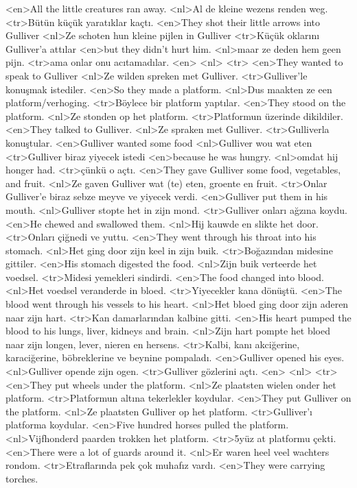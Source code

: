 <en>All the little creatures ran away.
<nl>Al de kleine wezens renden weg.
<tr>Bütün küçük yaratıklar kaçtı.
<en>They shot their little arrows into Gulliver
<nl>Ze schoten hun kleine pijlen in Gulliver
<tr>Küçük oklarını Gulliver’a attılar
<en>but they didn’t hurt him.
<nl>maar ze deden hem geen pijn.
<tr>ama onlar onu acıtamadılar.
<en>
<nl>
<tr>
<en>They wanted to speak to Gulliver
<nl>Ze wilden spreken met Gulliver.
<tr>Gulliver’le konuşmak istediler.
<en>So they made a platform.
<nl>Dus maakten ze een platform/verhoging.
<tr>Böylece bir platform yaptılar.
<en>They stood on the platform.
<nl>Ze stonden op het platform.
<tr>Platformun üzerinde dikildiler.
<en>They talked to Gulliver.
<nl>Ze spraken met Gulliver.
<tr>Gulliverla konuştular.
<en>Gulliver wanted some food
<nl>Gulliver wou wat eten
<tr>Gulliver biraz yiyecek istedi
<en>because he was hungry.
<nl>omdat hij honger had.
<tr>çünkü o açtı.
<en>They gave Gulliver some food, vegetables, and fruit.
<nl>Ze gaven Gulliver wat (te) eten, groente en fruit.
<tr>Onlar Gulliver’e biraz sebze meyve ve yiyecek verdi.
<en>Gulliver put them in his mouth.
<nl>Gulliver stopte het in zijn mond.
<tr>Gulliver onları ağzına koydu.
<en>He chewed and swallowed them.
<nl>Hij kauwde en slikte het door.
<tr>Onları çiğnedi ve yuttu.
<en>They went through his throat into his stomach.
<nl>Het ging door zijn keel in zijn buik.
<tr>Boğazından midesine gittiler.
<en>His stomach digested the food.
<nl>Zijn buik verteerde het voedsel.
<tr>Midesi yemekleri sindirdi.
<en>The food changed into blood.
<nl>Het voedsel veranderde in bloed.
<tr>Yiyecekler kana dönüştü.
<en>The blood went through his vessels to his heart.
<nl>Het bloed ging door zijn aderen naar zijn hart.
<tr>Kan damarlarından kalbine gitti.
<en>His heart pumped the blood to his lungs, liver, kidneys and brain.
<nl>Zijn hart pompte het bloed naar zijn longen, lever, nieren en hersens.
<tr>Kalbi, kanı akciğerine, karaciğerine, böbreklerine ve beynine pompaladı.
<en>Gulliver opened his eyes.
<nl>Gulliver opende zijn ogen.
<tr>Gulliver gözlerini açtı.
<en>
<nl>
<tr>
<en>They put wheels under the platform.
<nl>Ze plaatsten wielen onder het platform.
<tr>Platformun altına tekerlekler koydular.
<en>They put Gulliver on the platform.
<nl>Ze plaatsten Gulliver op het platform.
<tr>Gulliver’ı platforma koydular.
<en>Five hundred horses pulled the platform.
<nl>Vijfhonderd paarden trokken het platform.
<tr>5yüz at platformu çekti.
<en>There were a lot of guards around it.
<nl>Er waren heel veel wachters rondom.
<tr>Etraflarında pek çok muhafız vardı.
<en>They were carrying torches.
